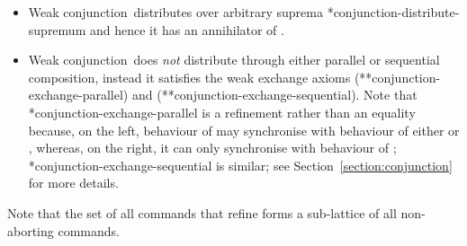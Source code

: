 \documentclass[fleqn]{fac}
\makeatletter
\def\refaxiom{\@ifnextchar*{\@refaxiom}{\@@refaxiom}}
\def\@refaxiom*#1{\ref{axiom-#1}\index{Axiom!#1|LawUse}}
\def\@@refaxiom#1{axiom~(\ref{axiom-#1})\index{Axiom!#1|LawUse}}
\newcommand{\Strictconjunction}{Weak conjunction}
\makeatother
\begin{document}
\begin{itemize}
\item
\Strictconjunction\ distributes over arbitrary suprema \refaxiom{conjunction-distribute-supremum}
and hence
it has an annihilator of .

\item
\Strictconjunction\ does \emph{not} distribute through either parallel or sequential composition,
instead it satisfies the weak exchange axioms 
(\refaxiom*{conjunction-exchange-parallel}) and (\refaxiom*{conjunction-exchange-sequential}).
Note that \refaxiom{conjunction-exchange-parallel} is a refinement rather than an equality 
because, on the left, behaviour of  may synchronise with 
behaviour of either  or ,
whereas, on the right, it can only synchronise with behaviour of ;
\refaxiom{conjunction-exchange-sequential} is similar;
see Section~\ref{section:conjunction} for more details.
\end{itemize}
Note that the set of all commands that refine  forms a sub-lattice of all non-aborting commands.
\end{document}
